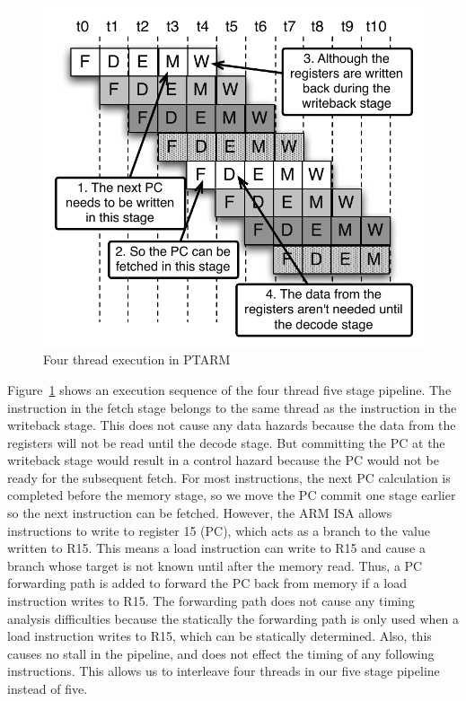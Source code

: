 \begin{figure}
  \vspace{-20pt}
  \begin{center}
    \includegraphics[scale=.65]{figs/four_thread_pipeline}
  \end{center}
  \vspace{-3mm}
  \caption{Four thread execution in PTARM}
  \label{fig:four_thread_pipeline}
  \vspace{-10pt}
\end{figure}      
Figure~\ref{fig:four_thread_pipeline} shows an execution sequence of the four thread five stage pipeline.
The instruction in the fetch stage belongs to the same thread as the instruction in the writeback stage.
This does not cause any data hazards because the data from the registers will not be read until the decode stage. 
But committing the PC at the writeback stage would result in a control hazard because the PC would not be ready for the subsequent fetch.
For most instructions, the next PC calculation is completed before the memory stage, so we move the PC commit one stage earlier so the next instruction can be fetched.
However, the ARM ISA allows instructions to write to register 15 (PC), which acts as a branch to the value written to R15.   
This means a load instruction can write to R15 and cause a branch whose target is not known until after the memory read.   
Thus, a PC forwarding path is added to forward the PC back from memory if a load instruction writes to R15.  
The forwarding path does not cause any timing analysis difficulties because the statically the forwarding path is only used when a load instruction writes to R15, which can be statically determined. 
Also, this causes no stall in the pipeline, and does not effect the timing of any following instructions. 
This allows us to interleave four threads in our five stage pipeline instead of five.    

